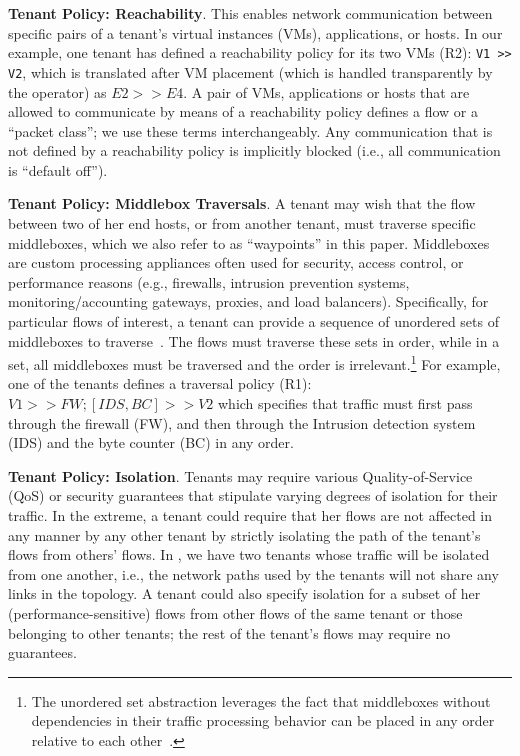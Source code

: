 \begin{compactitemize}
\item \textbf{Tenant Policy: Reachability}. This enables network communication
  between specific pairs of a tenant's virtual instances (VMs),
  applications, or hosts.  In our example, one tenant has defined a
  reachability policy for its two VMs (R2): \texttt{V1 >> V2}, which
  is translated after VM placement (which is handled transparently by
  the operator) as $E2 >> E4$. A pair of VMs, applications or hosts
  that are allowed to communicate by means of a reachability policy
  defines a flow or a ``packet class''; we use these terms
  interchangeably. Any communication that is not defined by a
  reachability policy is implicitly blocked (i.e., all communication
  is ``default off'').
  
\item \textbf{Tenant Policy: Middlebox Traversals}. A tenant may wish that the flow
  between two of her end hosts, or from another tenant, must traverse
  specific middleboxes, which we also refer to as ``waypoints'' in
  this paper. Middleboxes are custom processing appliances often used
  for security, access control, or performance reasons (e.g.,
  firewalls, intrusion prevention systems, monitoring/accounting
  gateways, proxies, and load balancers). Specifically, for particular
  flows of interest, a tenant can provide a sequence of unordered sets
  of middleboxes
  to traverse~\cite{pga}. The flows must traverse these sets in order,
  while in a set, all middleboxes must be traversed and the order is
  irrelevant.\footnote{The unordered set abstraction leverages the
    fact that middleboxes without dependencies in their traffic
    processing behavior can be placed in any order relative to each
    other~\cite{pga}.} For example, one of the tenants defines a
  traversal policy (R1): $V1 >> FW; [IDS,BC] >> V2$ which specifies
  that traffic must first pass through the firewall (FW), and then
  through the Intrusion detection system (IDS) and the byte counter
  (BC) in any order.


\item \textbf{Tenant Policy: Isolation}. Tenants may require various
  Quality-of-Service (QoS) or security guarantees that stipulate
  varying degrees of isolation for their traffic. In the extreme, a
  tenant could require that her flows are not affected in any manner
  by any other tenant by strictly isolating the path of the tenant's
  flows from others' flows. In , we have two
  tenants whose traffic will be isolated from one another, i.e., the
  network paths used by the tenants will not share any links in the
  topology.  A tenant could also specify isolation for a subset of her
  (performance-sensitive) flows from other flows of the same tenant or
  those belonging to other tenants; the rest of the tenant's flows may
  require no guarantees.


\end{compactitemize}
